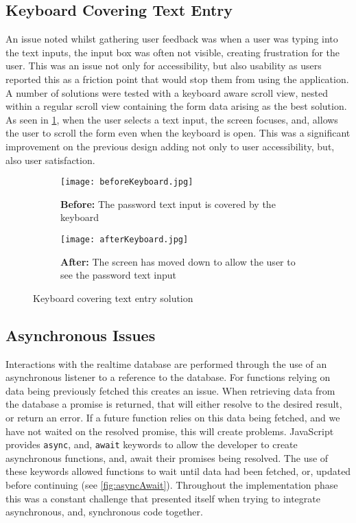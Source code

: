 \subsection*{Keyboard Covering Text Entry}
An issue noted whilst gathering user feedback was when a user was typing into the text inputs, the input box was often not visible, creating frustration for the user. This was an issue not only for accessibility, but also usability as users reported this as a friction point that would stop them from using the application. A number of solutions were tested with a keyboard aware scroll view, nested within a regular scroll view containing the form data arising as the best solution. As seen in \ref{fig:keyboard}, when the user selects a text input, the screen focuses, and, allows the user to scroll the form even when the keyboard is open. This was a significant improvement on the previous design adding not only to user accessibility, but, also user satisfaction.
\begin{figure}[!htbp]
    \centering
    \begin{subfigure}[b]{0.25\textwidth}
        \texttt{[image: beforeKeyboard.jpg]}
        \caption{\textbf{Before:} The password text input is covered by the keyboard}
    \end{subfigure}
    \hspace{1.5em}
    \begin{subfigure}[b]{0.25\textwidth}
        \texttt{[image: afterKeyboard.jpg]}
        \caption{\textbf{After:} The screen has moved down to  allow  the user to see the password text input}
    \end{subfigure}
    \caption{Keyboard covering text entry solution }
    \label{fig:keyboard}
\end{figure}


\subsection*{Asynchronous Issues}
Interactions with the realtime database are performed through the use of an asynchronous listener to a reference to the database. For functions relying on data being previously fetched this creates an issue. When retrieving data from the database a promise is returned, that will either resolve to the desired result, or return an error. If a future function relies on this data being fetched, and we have not waited on the resolved promise, this will create problems. JavaScript provides \texttt{async}, and, \texttt{await} keywords to allow the developer to create asynchronous functions, and, await their promises being resolved. The use of these keywords allowed functions to wait until data had been fetched, or, updated before continuing (see \ref{fig:asyncAwait}). Throughout the implementation phase this was a constant challenge that presented itself when trying to integrate asynchronous, and, synchronous code together.

